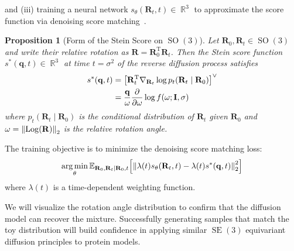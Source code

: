\documentclass{article}
\theoremstyle{plain}
\newtheorem{proposition}[theorem]{Proposition}
\theoremstyle{definition}
\theoremstyle{remark}
\DeclareMathOperator{\SE}{SE}
\DeclareMathOperator{\SO}{SO}
\DeclareMathOperator{\Log}{\operatorname{Log}}
\DeclareMathOperator*{\argmin}{arg\,min}
\DeclareMathOperator{\R}{\mathbb{R}}
\begin{document}
and (iii) training a neural network $s_\theta(\mathbf{R}_t, t) \in \R^3$ to approximate the score function via denoising score matching~\cite{score_based_diffusion}.

\begin{proposition}[Form of the Stein Score on $\SO(3)$]\label{prop:stein_score}
    Let $\mathbf{R}_0, \mathbf{R}_t\in\SO(3)$ and write their relative rotation as $\mathbf{R} = \mathbf{R}_0^\mathrm{T}\mathbf{R}_t$. Then the Stein score function $s^*(\mathbf{q}, t) \in \R^3$ at time $t = \sigma^2$ of the reverse diffusion process satisfies
    \begin{equation}
        \begin{aligned}
            s^*(\mathbf{q}, t) & = \qty[\mathbf{R}_t^\mathrm{T} \nabla_{\mathbf{R}_t} \log p_t(\mathbf{R}_t\mid \mathbf{R}_0)]^\vee \\
                               & = \frac{\mathbf{q}}{\omega} \pdv{\omega} \log f(\omega; \mathbf{I}, \sigma)
        \end{aligned}
    \end{equation}
    where $p_t(\mathbf{R}_t\mid \mathbf{R}_0)$ is the conditional distribution of $\mathbf{R}_t$ given $\mathbf{R}_0$ and $\omega = \norm{\Log(\mathbf{R})}_2$ is the relative rotation angle.
\end{proposition}

The training objective is to minimize the denoising score matching loss:
\begin{equation}
    \argmin_\theta \mathbb{E}_{\mathbf{R}_0, \mathbf{R}_t\mid \mathbf{R}_0, t} \qty[\norm{\lambda(t) s_\theta(\mathbf{R}_t, t)-\lambda(t) s^*(\mathbf{q}, t)}^2_2]
\end{equation}
where $\lambda(t)$ is a time-dependent weighting function.

We will visualize the rotation angle distribution to confirm that the diffusion model can recover the mixture. Successfully generating samples that match the toy distribution will build confidence in applying similar $\SE(3)$ equivariant diffusion principles to protein models.
\end{document}
